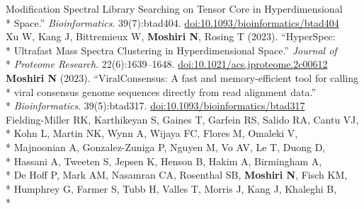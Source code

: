 \documentclass[margin,line]{res}
\begin{document}
\begin{resume}
\hspace*{9mm} Modification Spectral Library Searching on Tensor Core in Hyperdimensional\\*\vspace{2mm}
\hspace*{8mm} Space.'' \textit{Bioinformatics}. 39(7):btad404. \href{https://doi.org/10.1093/bioinformatics/btad404}{doi:10.1093/bioinformatics/btad404}\\
\hspace*{4mm} Xu W, Kang J, Bittremieux W, \textbf{Moshiri N}, Rosing T (2023). ``HyperSpec:\\*
\hspace*{9mm} Ultrafast Mass Spectra Clustering in Hyperdimensional Space.'' \textit{Journal of}\\*\vspace{2mm}
\hspace*{8mm} \textit{Proteome Research}. 22(6):1639--1648. \href{https://doi.org/10.1021/acs.jproteome.2c00612}{doi:10.1021/acs.jproteome.2c00612}\\
\hspace*{4mm} \textbf{Moshiri N} (2023). ``ViralConsensus: A fast and memory-efficient tool for calling\\*
\hspace*{9mm} viral consensus genome sequences directly from read alignment data.''\\*\vspace{2mm}
\hspace*{8mm} \textit{Bioinformatics}. 39(5):btad317. \href{https://doi.org/10.1093/bioinformatics/btad317}{doi:10.1093/bioinformatics/btad317}\\
\hspace*{4mm} Fielding-Miller RK, Karthikeyan S, Gaines T, Garfein RS, Salido RA, Cantu VJ,\\*
\hspace*{9mm} Kohn L, Martin NK, Wynn A, Wijaya FC, Flores M, Omaleki V,\\*
\hspace*{9mm} Majnoonian A, Gonzalez-Zuniga P, Nguyen M, Vo AV, Le T, Duong D,\\*
\hspace*{9mm} Hassani A, Tweeten S, Jepsen K, Henson B, Hakim A, Birmingham A,\\*
\hspace*{9mm} De Hoff P, Mark AM, Nasamran CA, Rosenthal SB, \textbf{Moshiri N}, Fisch KM,\\*
\hspace*{9mm} Humphrey G, Farmer S, Tubb H, Valles T, Morris J, Kang J, Khaleghi B,\\*

\end{resume}
\end{document}
